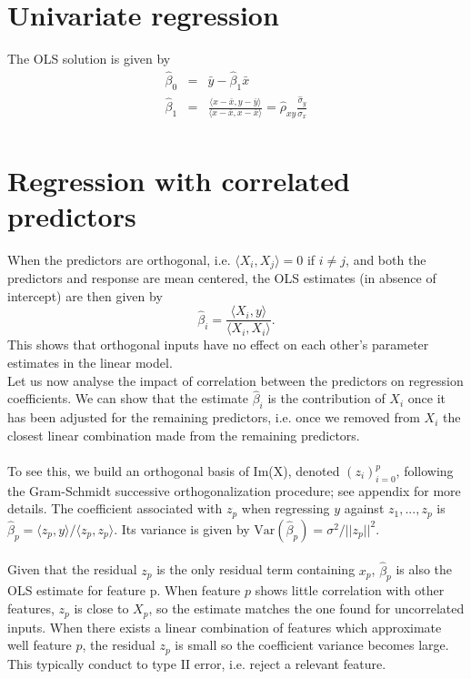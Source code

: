 \documentclass[]{article}
\begin{document}
\section{Univariate regression}

The OLS solution is given by
\begin{eqnarray}
\hat{\beta}_0 &=& \bar{y}-\hat{\beta}_1\bar{x} \\
\hat{\beta}_1 &=& \frac{\langle x-\bar{x}, y-\bar{y} \rangle}{\langle x-\bar{x}, x-\bar{x} \rangle} = \hat{\rho}_{xy}\frac{\hat{\sigma}_y}{\hat{\sigma}_x}\\
\end{eqnarray}

\section{Regression with correlated predictors}

When the predictors are orthogonal, i.e. $\langle X_i,X_j\rangle=0$ if $i \neq j$, and both the predictors and response are mean centered, the OLS estimates (in absence of intercept) are then given by
\begin{equation}
\hat{\beta}_i=\frac{\langle X_i,y \rangle}{\langle X_i,X_i\rangle}.
\end{equation}
This shows that orthogonal inputs have no effect on each other's parameter estimates in the linear model. \\

\noindent Let us now analyse the impact of correlation between the predictors on regression coefficients. We can show that the estimate $\hat{\beta}_i$ is the contribution of $X_i$ once it has been adjusted for the remaining predictors, i.e. once we removed from $X_i$ the closest linear combination made from the remaining predictors. \\ \\
\noindent To see this, we build an orthogonal basis of Im(X), denoted $(z_i)_{i=0}^p$, following the Gram-Schmidt successive orthogonalization procedure; see appendix for more details. The coefficient associated with $z_p$ when regressing $y$ against $z_1,...,z_p$ is $\hat{\beta}_p=\langle z_p,y \rangle / \langle z_p,z_p \rangle$. Its variance is given by $\mathrm{Var}(\hat{\beta}_p)=\sigma^2/||z_p||^2$. \\ \\
\noindent Given that the residual $z_p$ is the only residual term containing $x_p$, $\hat{\beta}_p$ is also the OLS estimate for feature p. When feature $p$ shows little correlation with other features, $z_p$ is close to $X_p$, so the estimate matches the one found for uncorrelated inputs. When there exists a linear combination of features which approximate well feature $p$, the residual $z_p$ is small so the coefficient variance becomes large. This typically conduct to type II error, i.e. reject a relevant feature.
\end{document}
